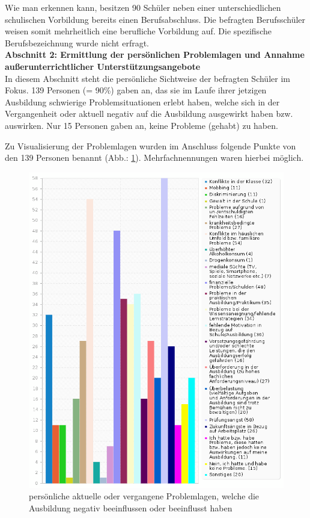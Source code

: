 \noindent
Wie man erkennen kann, besitzen 90 Schüler neben einer unterschiedlichen schulischen Vorbildung bereits einen Berufsabschluss. Die befragten Berufsschüler weisen somit mehrheitlich eine berufliche Vorbildung auf. Die spezifische Berufsbezeichnung wurde nicht erfragt.\\

\noindent
\textbf{Abschnitt 2: Ermittlung der persönlichen Problemlagen und Annahme außerunterrichtlicher Unterstützungsangebote}\\

\noindent
In diesem Abschnitt steht die persönliche Sichtweise der befragten Schüler im Fokus. 139 Personen (= 90\%) gaben an, das sie im Laufe ihrer jetzigen Ausbildung schwierige Problemsituationen erlebt haben, welche sich in der Vergangenheit oder aktuell negativ auf die Ausbildung ausgewirkt haben bzw. auswirken. Nur 15 Personen gaben an, keine Probleme (gehabt) zu haben. 

Zu Visualisierung der Problemlagen wurden im Anschluss folgende Punkte von den 139 Personen benannt (Abb.: \ref{fig:Aktuelle-oder-vergangene-Probleme-der-Schueler-welche-die-Ausbildung-negativ-beeinflussen-oder-negativ-beeinflusst-haben}). Mehrfachnennungen waren hierbei möglich. 

\begin{figure}[h]
	\centering
		\includegraphics[width=1.0\textwidth]{images/Aktuelle-oder-vergangene-Probleme-der-Schueler-welche-die-Ausbildung-negativ-beeinflussen-oder-negativ-beeinflusst-haben.png}
	\caption{persönliche aktuelle oder vergangene Problemlagen, welche die Ausbildung negativ beeinflussen oder beeinflusst haben}
	\label{fig:Aktuelle-oder-vergangene-Probleme-der-Schueler-welche-die-Ausbildung-negativ-beeinflussen-oder-negativ-beeinflusst-haben}
\end{figure}

